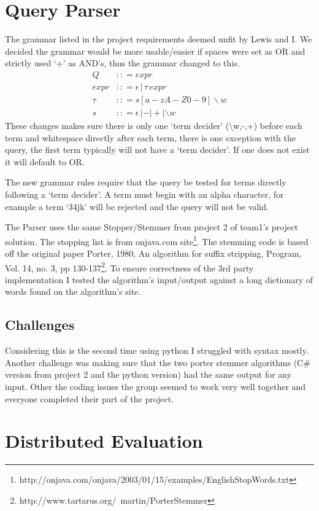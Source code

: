 \documentclass[letterpaper,11pt,twoside]{article}
\begin{document}
\section{Query Parser}
The grammar listed in the project requirements deemed unfit by Lewis and I. We decided the grammar would be more usable/easier if spaces were set as OR and strictly used `+' as AND's, thus the grammar changed to this.
\begin{align*}
	Q &:: = expr \\
	expr &:: = \epsilon \, | \, \tau \, expr \\
	\tau &:: = s[a-zA-Z0-9]\backslash w \\
	s &:: = \epsilon \, | - | + | \backslash w
\end{align*}
These changes makes sure there is only one `term decider' (\textbackslash w,-,+) before each term and whitespace directly after each term, there is one exception with the query, the first term typically will not have a `term decider'. If one does not exist it will default to OR.  

The new grammar rules require that the query be tested for terms directly following a `term decider'. A term must begin with an alpha character, for example a term `34jk' will be rejected and the query will not be valid.

The Parser uses the same Stopper/Stemmer from project 2 of team1’s project solution. The stopping list is from onjava.com site\footnote{http://onjava.com/onjava/2003/01/15/examples/EnglishStopWords.txt}. The stemming code is based off the original paper Porter, 1980, An algorithm for suffix stripping, Program, Vol. 14, no. 3, pp 130-137\footnote{http://www.tartarus.org/~martin/PorterStemmer}. To ensure correctness of the 3rd party implementation I tested the algorithm’s input/output against a long dictionary of words found on the algorithm's site.

\subsection{Challenges}
Considering this is the second time using python I struggled with syntax mostly. Another challenge was making sure that the two porter stemmer algorithms (C\# version from project 2 and the python version) had the same output for any input. Other the coding issues the group seemed to work very well together and everyone completed their part of the project.


\section{Distributed Evaluation}
\end{document}
